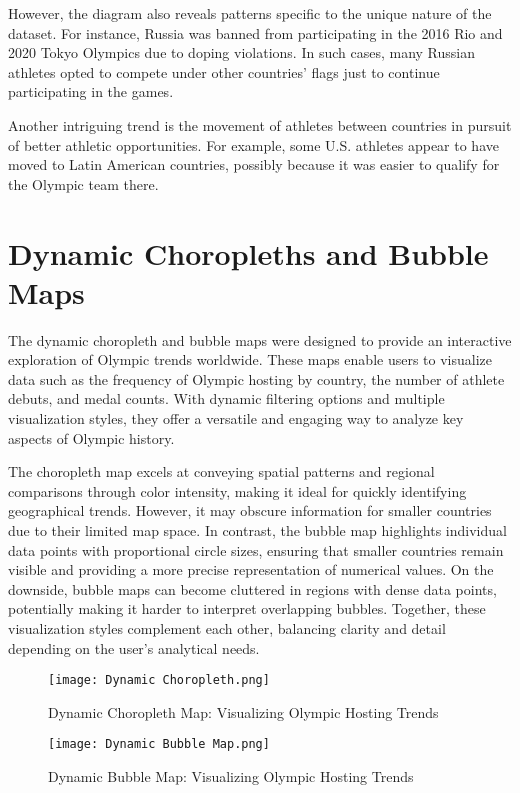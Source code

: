 However, the diagram also reveals patterns specific to the unique nature of the dataset. For instance, Russia was banned from participating in the 2016 Rio and 2020 Tokyo Olympics due to doping violations. In such cases, many Russian athletes opted to compete under other countries' flags just to continue participating in the games.

Another intriguing trend is the movement of athletes between countries in pursuit of better athletic opportunities. For example, some U.S. athletes appear to have moved to Latin American countries, possibly because it was easier to qualify for the Olympic team there.


\section{Dynamic Choropleths and Bubble Maps}

The dynamic choropleth and bubble maps were designed to provide an interactive exploration of Olympic trends worldwide. These maps enable users to visualize data such as the frequency of Olympic hosting by country, the number of athlete debuts, and medal counts. With dynamic filtering options and multiple visualization styles, they offer a versatile and engaging way to analyze key aspects of Olympic history.

The choropleth map excels at conveying spatial patterns and regional comparisons through color intensity, making it ideal for quickly identifying geographical trends. However, it may obscure information for smaller countries due to their limited map space. In contrast, the bubble map highlights individual data points with proportional circle sizes, ensuring that smaller countries remain visible and providing a more precise representation of numerical values. On the downside, bubble maps can become cluttered in regions with dense data points, potentially making it harder to interpret overlapping bubbles. Together, these visualization styles complement each other, balancing clarity and detail depending on the user's analytical needs.

\begin{figure}[ht]
    \centering
    \texttt{[image: Dynamic Choropleth.png]}
    \caption{Dynamic Choropleth Map: Visualizing Olympic Hosting Trends}
    \label{fig:choropleth_map}
\end{figure}

\begin{figure}[ht]
    \centering
    \texttt{[image: Dynamic Bubble Map.png]}
    \caption{Dynamic Bubble Map: Visualizing Olympic Hosting Trends}
    \label{fig:bubble_map}
\end{figure}

